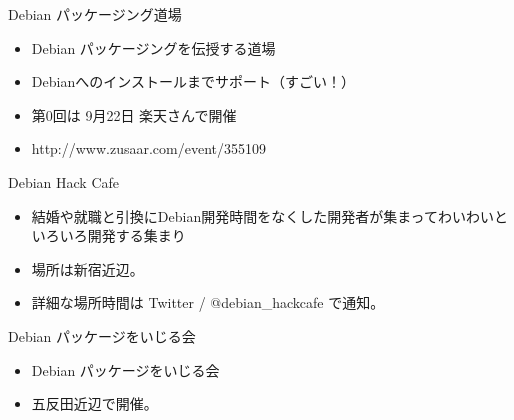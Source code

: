 \begin{frame}{Debian パッケージング道場}

\begin{itemize}
  \item Debian パッケージングを伝授する道場
  \item Debianへのインストールまでサポート（すごい！）
  \item 第0回は 9月22日 楽天さんで開催
  \item http://www.zusaar.com/event/355109
\end{itemize}

\end{frame}


\begin{frame}{Debian Hack Cafe}

\begin{itemize}
  \item 結婚や就職と引換にDebian開発時間をなくした開発者が集まってわいわいといろいろ開発する集まり
  \item 場所は新宿近辺。
  \item 詳細な場所時間は Twitter  / @debian\_hackcafe で通知。
\end{itemize}

\end{frame}

\begin{frame}{Debian パッケージをいじる会}

\begin{itemize}
  \item Debian パッケージをいじる会
  \item 五反田近辺で開催。
\end{itemize}

\end{frame}

\begin{frame}

\begin{center}
\end{center}

\end{frame}

